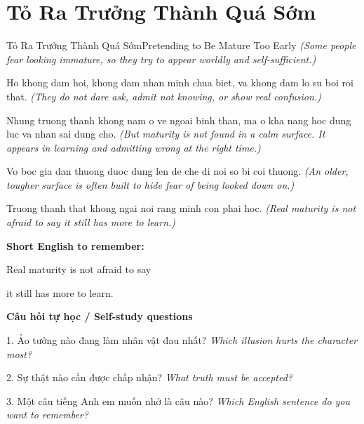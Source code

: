 \section{Tỏ Ra Trưởng Thành Quá Sớm}
\begin{truyen}{Tỏ Ra Trưởng Thành Quá Sớm}{Pretending to Be Mature Too Early}
\textit{(Some people fear looking immature, so they try to appear worldly and self-sufficient.)}

Ho khong dam hoi, khong dam nhan minh chua biet, va khong dam lo su boi roi that.
\textit{(They do not dare ask, admit not knowing, or show real confusion.)}

Nhung truong thanh khong nam o ve ngoai binh than, ma o kha nang hoc dung luc va nhan sai dung cho.
\textit{(But maturity is not found in a calm surface. It appears in learning and admitting wrong at the right time.)}

Vo boc gia dan thuong duoc dung len de che di noi so bi coi thuong.
\textit{(An older, tougher surface is often built to hide fear of being looked down on.)}

\end{truyen}

\begin{baihoc}
Truong thanh that khong ngai noi rang minh con phai hoc.
\textit{(Real maturity is not afraid to say it still has more to learn.)}
\end{baihoc}

\begin{ghinhoanh}
\textbf{Short English to remember:}

Real maturity is not afraid to say

it still has more to learn.

\end{ghinhoanh}

\begin{tuhocnhanh}
\textbf{Câu hỏi tự học / Self-study questions}

1. Ảo tưởng nào đang làm nhân vật đau nhất? \textit{Which illusion hurts the character most?}

2. Sự thật nào cần được chấp nhận? \textit{What truth must be accepted?}

3. Một câu tiếng Anh em muốn nhớ là câu nào? \textit{Which English sentence do you want to remember?}
\end{tuhocnhanh}
\ngancach

